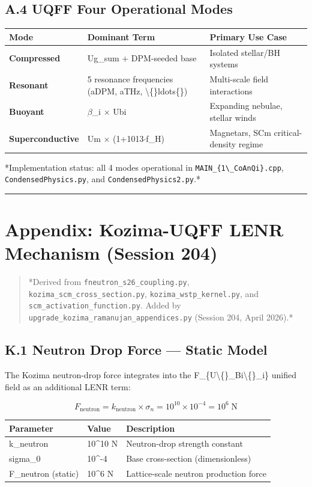 \documentclass[11pt]{article}
\begin{document}
\subsection*{A.4 UQFF Four Operational Modes}

\begin{center}
\begin{longtable}{lll}
\toprule
Mode & Dominant Term & Primary Use Case \tabularnewline
\midrule
\endhead
\textbf{Compressed} & Ug\_sum + DPM-seeded base & Isolated stellar/BH systems \tabularnewline
\textbf{Resonant} & 5 resonance frequencies (aDPM, aTHz, \textbackslash\{\}ldots\{\}) & Multi-scale field interactions \tabularnewline
\textbf{Buoyant} & $\beta$\_i $\times$ Ubi & Expanding nebulae, stellar winds \tabularnewline
\textbf{Superconductive} & Um $\times$ (1+1013$\cdot$f\_H) & Magnetars, SCm critical-density regime \tabularnewline
\bottomrule
\end{longtable}
\end{center}

*Implementation status: all 4 modes operational in \verb|MAIN_{1\_CoAnQi}.cpp|, \verb|CondensedPhysics.py|, and \verb|CondensedPhysics2.py|.*

\noindent\rule{\textwidth}{0.4pt}

\section*{Appendix: Kozima-UQFF LENR Mechanism (Session 204)}

\begin{quote}
*Derived from \verb|fneutron_s26_coupling.py|, \verb|kozima_scm_cross_section.py|,
\verb|kozima_wstp_kernel.py|, and \verb|scm_activation_function.py|. Added by
\verb|upgrade_kozima_ramanujan_appendices.py| (Session 204, April 2026).*
\end{quote}

\subsection*{K.1 Neutron Drop Force --- Static Model}

The Kozima neutron-drop force integrates into the F\_\{U\textbackslash\{\}\_Bi\textbackslash\{\}\_i\} unified field as an additional LENR term:

$$F_{\mathrm{neutron}} = k_{\mathrm{neutron}} \times \sigma_n = 10^{10} \times 10^{-4} = 10^6 \;\text{N}$$

\begin{center}
\begin{longtable}{lll}
\toprule
Parameter & Value & Description \tabularnewline
\midrule
\endhead
k\_neutron & 10\textasciicircum{}10 N & Neutron-drop strength constant \tabularnewline
sigma\_0 & 10\textasciicircum{}-4 & Base cross-section (dimensionless) \tabularnewline
F\_neutron (static) & 10\textasciicircum{}6 N & Lattice-scale neutron production force \tabularnewline
\bottomrule
\end{longtable}
\end{center}
\end{document}
